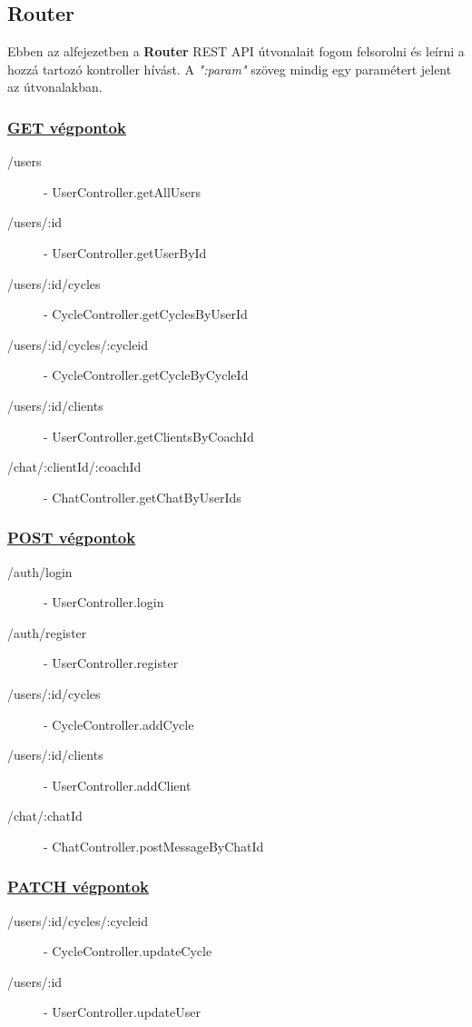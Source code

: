 \subsection{Router}

Ebben az alfejezetben a \textbf{Router} REST API útvonalait fogom felsorolni és leírni a hozzá tartozó kontroller hívást. A \emph{":param"} szöveg mindig egy paramétert jelent az útvonalakban.

\subsubsection{\underline{GET végpontok}}

\begin{description}
	\item[/users] - UserController.getAllUsers
	\item[/users/:id] - UserController.getUserById 
	\item[/users/:id/cycles] - CycleController.getCyclesByUserId
	\item[/users/:id/cycles/:cycleid] - CycleController.getCycleByCycleId
	\item[/users/:id/clients] - UserController.getClientsByCoachId
	\item[/chat/:clientId/:coachId] - ChatController.getChatByUserIds
\end{description}

\subsubsection*{\underline{POST végpontok}}

\begin{description}
	\item[/auth/login] - UserController.login
	\item[/auth/register] - UserController.register
	\item[/users/:id/cycles] -  CycleController.addCycle
	\item[/users/:id/clients] - UserController.addClient
	\item[/chat/:chatId] - ChatController.postMessageByChatId
\end{description}

\subsubsection{\underline{PATCH végpontok}}

\begin{description}
	\item[/users/:id/cycles/:cycleid] - CycleController.updateCycle
	\item[/users/:id] - UserController.updateUser
\end{description}

